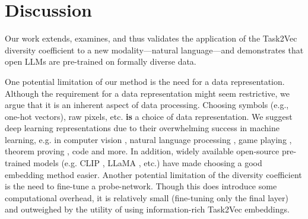 \documentclass[10pt]{article} %
\begin{document}
\section{Discussion}
Our work extends, examines, and thus validates the application of the Task2Vec diversity coefficient to a new modality---natural language---and demonstrates that open LLMs are pre-trained on formally diverse data.

One potential limitation of our method is the need for a data representation. 
Although the requirement for a data representation might seem restrictive, we argue that it is an inherent aspect of data processing.
Choosing symbols (e.g., one-hot vectors), raw pixels, etc. \textbf{is} a choice of data representation.
We suggest deep learning representations due to their overwhelming success in machine learning, e.g. in computer vision \citep{alexnet, resnet}, natural language processing \citep{bert, gpt3, chowdhery2022palm, gpt4, google2023palm2}, game playing \citep{alphago, atari1, EfficientZero}, theorem proving \citep{skiptree, gptf, pact}, code \citep{codex} and more.
In addition, widely available open-source pre-trained models (e.g. CLIP \citep{clip}, LLaMA \citep{llama}, etc.) have made choosing a good embedding method easier. Another potential limitation of the diversity coefficient is the need to fine-tune a probe-network. Though this does introduce some computational overhead, it is relatively small (fine-tuning only the final layer) and outweighed by the utility of using information-rich Task2Vec embeddings. %
\end{document}

